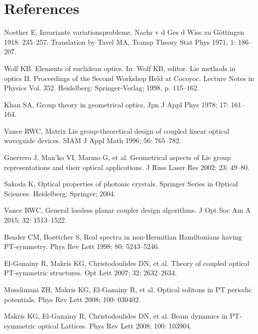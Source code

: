 \documentclass[12pt]{iopart}
\begin{document}
\section*{References}

\begin{thebibliography}{100}
	
	
	 Noether E,
	Invariante variationsprobleme.
	Nachr v d Ges d Wiss zu G\"ottingen 1918: 235--257.
	Translation by Tavel MA, Transp Theory Stat Phys 1971;  1: 186--207.
	
	 Wolf KB.
	Elements of euclidean optics.
	In: Wolf KB, editor. Lie methods in optics II. Proceedings of the Second Workshop Held at Cocoyoc. Lecture Notes in Physics Vol. 352. Heidelberg: Springer-Verlag; 1998, p. 115--162.
	
	 Khan SA,
	Group theory in geometrical optics.
	Jpn J Appl Phys 1978;  17: 161--164.
	
	 Vance RWC,
	Matrix Lie group-theoretical design of coupled linear optical waveguide devices.
	SIAM J Appl Math 1996; 56: 765--782.
	
	 Guerrero J, Man'ko VI, Marmo G, et al.
	Geometrical aspects of Lie group representations and their optical applications.
	J Russ Laser Res 2002;  23: 49--80.
	
	 Sakoda K,
	Optical properties of photonic crystals.
	Springer Series in Optical Sciences. Heidelberg: Springer; 2004.
	
	 Vance RWC,
	General lossless planar coupler design algorithms.
	J Opt Soc Am A 2015; 32: 1513--1522.
	
	 Bender CM, Boettcher S,
	Real spectra in non-Hermitian Hamiltonians having PT-symmetry.
	Phys Rev Lett 1998;  80: 5243--5246.
	
	 El-Ganainy R, Makris KG, Christodoulides DN, et al.
	Theory of coupled optical PT-symmetric structures.
	Opt Lett 2007;  32: 2632--2634.
	
	 Musslimani ZH, Makris KG, El-Ganainy R, et al.
	Optical solitons in PT periodic potentials.
	Phys Rev Lett 2008;   100: 030402.
	
	 Makris KG, El-Ganainy R, Christodoulides DN, et al.
	Beam dynamics in  PT-symmetric optical Lattices.
	Phys Rev Lett 2008;  100: 103904.
	

\end{thebibliography}
\end{document}
